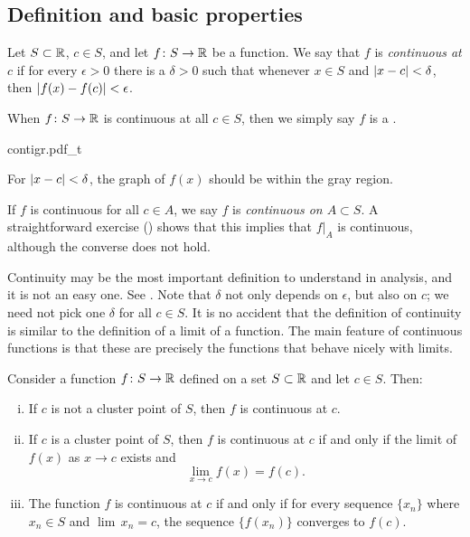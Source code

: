 \subsection{Definition and basic properties}

\begin{defn}
Let $S \subset {\mathbb{R}}$, $c \in S$, and let $f \colon S \to {\mathbb{R}}$ be a function.
We say
that $f$ is \emph{continuous at $c$}
if for every $\epsilon > 0$
there is a $\delta > 0$ such that whenever $x \in S$ and $\left\lvert {x-c} \right\rvert <
\delta$, then
$\left\lvert {f(x)-f(c)} \right\rvert < \epsilon$.


When $f \colon S \to {\mathbb{R}}$ is continuous at all $c \in S$, then we simply say
$f$ is a \emph{}.
\end{defn}
\begin{myfigureht}
{contigr.pdf_t}
\caption{For $\left\lvert {x-c} \right\rvert < \delta$, the graph of $f(x)$ should be within the gray region.\label{fig:contigr}}
\end{myfigureht}

If $f$ is continuous for all $c \in A$, we say
$f$ is \emph{continuous on $A \subset S$}.  A straightforward
exercise ()
shows that this implies that $f|_A$ is continuous, although
the converse does not hold.

Continuity may be the most important definition to understand in analysis,
and it is not an easy one.  See .
Note that $\delta$ not only
depends on $\epsilon$, but also on $c$;  we need not pick
one $\delta$ for all $c \in S$.
It is no accident 
that the definition of continuity is similar to the definition of a
limit of a function.  The main feature of continuous functions
is that these are precisely the functions that behave nicely with limits.

\begin{prop} \label{contbasic:prop}
Consider a function $f \colon S \to {\mathbb{R}}$ defined on a set  $S \subset {\mathbb{R}}$
and let $c \in S$.
Then:
\begin{enumerate}[(i)]
\item If $c$ is not a cluster point of $S$, then $f$ is continuous at $c$.
\item If $c$ is a cluster point of $S$, then $f$ is continuous at $c$
if and only if the limit of $f(x)$ as $x \to c$ exists and
\begin{equation*}
\lim_{x\to c} f(x) = f(c) .
\end{equation*}
\item The function $f$ is continuous at $c$ if and only if for every sequence $\{ x_n \}$
where $x_n \in S$ and $\lim\, x_n = c$, the sequence $\{ f(x_n) \}$ converges
to $f(c)$.
\end{enumerate}
\end{prop}

